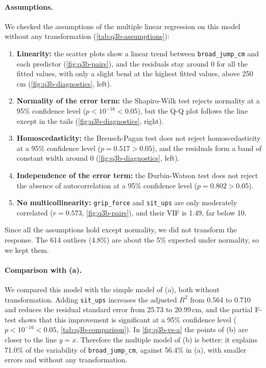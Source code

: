 \paragraph{Assumptions.}
We checked the assumptions of the multiple linear regression on this model without any transformation (\autoref{tab:q3b-assumptions}):
\begin{enumerate}
  \item \textbf{Linearity:} the scatter plots show a linear trend between \texttt{broad\_jump\_cm} and each predictor (\autoref{fig:q3b-pairs}), and the residuals stay around 0 for all the fitted values, with only a slight bend at the highest fitted values, above 250\,cm (\autoref{fig:q3b-diagnostics}, left).
  \item \textbf{Normality of the error term:} the Shapiro-Wilk test rejects normality at a 95\% confidence level ($p < 10^{-16} < 0.05$), but the Q-Q plot follows the line except in the tails (\autoref{fig:q3b-diagnostics}, right).
  \item \textbf{Homoscedasticity:} the Breusch-Pagan test does not reject homoscedasticity at a 95\% confidence level ($p = 0.517 > 0.05$), and the residuals form a band of constant width around 0 (\autoref{fig:q3b-diagnostics}, left).
  \item \textbf{Independence of the error term:} the Durbin-Watson test does not reject the absence of autocorrelation at a 95\% confidence level ($p = 0.802 > 0.05$).
  \item \textbf{No multicollinearity:} \texttt{grip\_force} and \texttt{sit\_ups} are only moderately correlated ($r = 0.573$, \autoref{fig:q3b-pairs}), and their VIF is 1.49, far below 10.
\end{enumerate}
Since all the assumptions hold except normality, we did not transform the response.
The 614 outliers (4.8\%) are about the 5\% expected under normality, so we kept them.

\paragraph{Comparison with (a).}
We compared this model with the simple model of (a), both without transformation.
Adding \texttt{sit\_ups} increases the adjusted $R^2$ from 0.564 to 0.710 and reduces the residual standard error from 25.73 to 20.99\,cm, and the partial F-test shows that this improvement is significant at a 95\% confidence level ($p < 10^{-16} < 0.05$, \autoref{tab:q3b-comparison}).
In \autoref{fig:q3b-vs-a} the points of (b) are closer to the line $y = x$.
Therefore the multiple model of (b) is better: it explains 71.0\% of the variability of \texttt{broad\_jump\_cm}, against 56.4\% in (a), with smaller errors and without any transformation.

